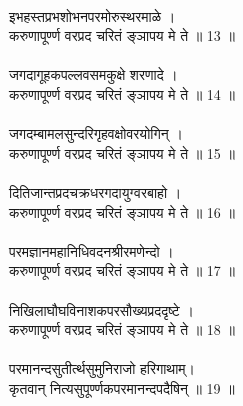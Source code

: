 \\
इभहस्तप्रभशोभनपरमोरुस्थरमाळे ।\\
करुणापूर्ण्ण वरप्रद चरितं ङ्ञापय मे ते ॥ 13 ॥\\
\\
जगदागूहकपल्लवसमकुक्षे शरणादे ।\\
करुणापूर्ण्ण वरप्रद चरितं ङ्ञापय मे ते ॥ 14 ॥\\
\\
जगदम्बामलसुन्दरिगृहवक्षोवरयोगिन् ।\\
करुणापूर्ण्ण वरप्रद चरितं ङ्ञापय मे ते ॥ 15 ॥\\
\\
दितिजान्तप्रदचक्रधरगदायुग्वरबाहो ।\\
करुणापूर्ण्ण वरप्रद चरितं ङ्ञापय मे ते ॥ 16 ॥\\
\\
परमज्ञानमहानिधिवदनश्रीरमणेन्दो ।\\
करुणापूर्ण्ण वरप्रद चरितं ङ्ञापय मे ते ॥ 17 ॥\\
\\
निखिलाघौघविनाशकपरसौख्यप्रददृष्टे ।\\
करुणापूर्ण्ण वरप्रद चरितं ङ्ञापय मे ते ॥ 18 ॥\\
\\
परमानन्दसुतीर्त्थसुमुनिराजो हरिगाथाम्।\\
कृतवान् नित्यसुपूर्ण्णकपरमानन्दपदैषिन् ॥ 19 ॥\\
\\

